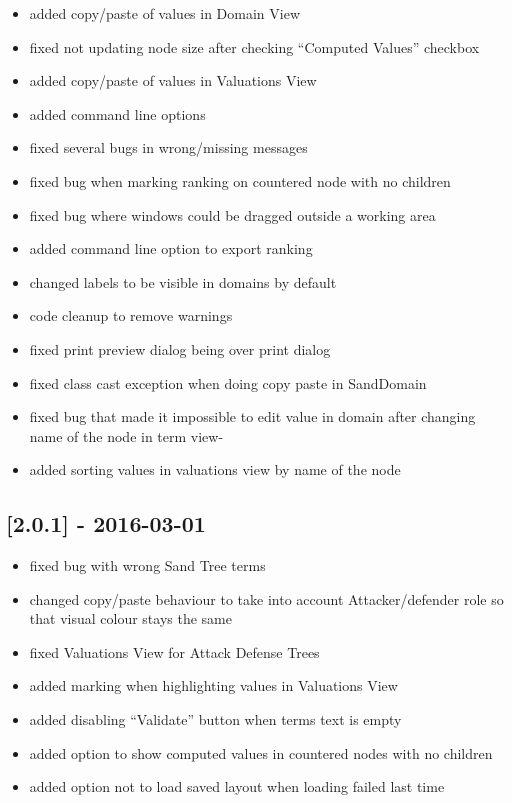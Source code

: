 \begin{itemize}
\tightlist
\item
  added copy/paste of values in Domain View
\item
  fixed not updating node size after checking ``Computed Values''
  checkbox
\item
  added copy/paste of values in Valuations View
\item
  added command line options
\item
  fixed several bugs in wrong/missing messages
\item
  fixed bug when marking ranking on countered node with no children
\item
  fixed bug where windows could be dragged outside a working area
\item
  added command line option to export ranking
\item
  changed labels to be visible in domains by default
\item
  code cleanup to remove warnings
\item
  fixed print preview dialog being over print dialog
\item
  fixed class cast exception when doing copy paste in SandDomain
\item
  fixed bug that made it impossible to edit value in domain after
  changing name of the node in term view-
\item
  added sorting values in valuations view by name of the node
\end{itemize}

\subsection{{[}2.0.1{]} - 2016-03-01}\label{section-4}

\begin{itemize}
\tightlist
\item
  fixed bug with wrong Sand Tree terms
\item
  changed copy/paste behaviour to take into account Attacker/defender
  role so that visual colour stays the same
\item
  fixed Valuations View for Attack Defense Trees
\item
  added marking when highlighting values in Valuations View
\item
  added disabling ``Validate'' button when terms text is empty
\item
  added option to show computed values in countered nodes with no
  children
\item
  added option not to load saved layout when loading failed last time
\end{itemize}

